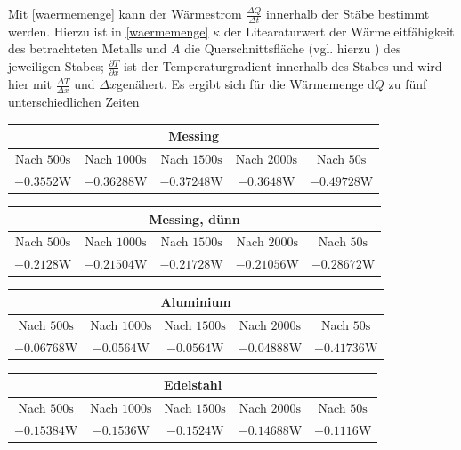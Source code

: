 Mit \eqref{waermemenge} kann der Wärmestrom $\frac{\Delta{Q}}{\Delta{t}}$ innerhalb der Stäbe bestimmt werden. 
Hierzu ist in \eqref{waermemenge} $\kappa$ der Litearaturwert der Wärmeleitfähigkeit des betrachteten Metalls und $A$ die Querschnittsfläche (vgl. hierzu \cite{V204}) des jeweiligen Stabes; $\frac{\partial T}{\partial x}$ ist der Temperaturgradient innerhalb des Stabes und wird hier mit $\frac{\Delta T}{\Delta x}$ und $\Delta x$genähert.
Es ergibt sich für die Wärmemenge $\mathup{d}Q$ zu fünf unterschiedlichen Zeiten\\
\begin{table}
\centering
\begin{tabular}{ccccc}
	\multicolumn{5}{c}{Messing}\\
	\toprule
	Nach $500\si{\second}$&Nach $1000\si{\second}$& Nach $1500\si{\second}$&Nach $2000\si{\second}$& Nach $50\si{\second}$\\
	$-0.3552\si{\watt}$&$-0.36288\si{\watt}$&$-0.37248\si{\watt}$&$-0.3648\si{\watt}$&$-0.49728\si{\watt}$\\
	\bottomrule
\end{tabular}
\end{table}
\begin{table}[h!]
\centering
\begin{tabular}{ccccc}
	\multicolumn{5}{c}{Messing, dünn}\\
	\toprule
	Nach $500\si{\second}$&Nach $1000\si{\second}$& Nach $1500\si{\second}$&Nach $2000\si{\second}$& Nach $50\si{\second}$\\
	$-0.2128\si{\watt}$&$-0.21504\si{\watt}$&$-0.21728\si{\watt}$&$-0.21056\si{\watt}$&$-0.28672\si{\watt}$\\
	\bottomrule
\end{tabular}
\end{table}
\begin{table}[h!]
\centering
\begin{tabular}{ccccc}
	\multicolumn{5}{c}{Aluminium}\\
	\toprule
	Nach $500\si{\second}$&Nach $1000\si{\second}$& Nach $1500\si{\second}$&Nach $2000\si{\second}$& Nach $50\si{\second}$\\

	$-0.06768\si{\watt}$&$-0.0564\si{\watt}$&$-0.0564\si{\watt}$&$-0.04888\si{\watt}$&$-0.41736\si{\watt}$\\
	\bottomrule
\end{tabular}
\end{table}
\begin{table}[h!]
\centering
\begin{tabular}{ccccc}
	\multicolumn{5}{c}{Edelstahl}\\
	\toprule
	Nach $500\si{\second}$&Nach $1000\si{\second}$& Nach $1500\si{\second}$&Nach $2000\si{\second}$& Nach $50\si{\second}$\\
	$-0.15384\si{\watt}$&$-0.1536\si{\watt}$&$-0.1524\si{\watt}$&$-0.14688\si{\watt}$&$-0.1116\si{\watt}$\\
	\bottomrule
\end{tabular}
\end{table}
